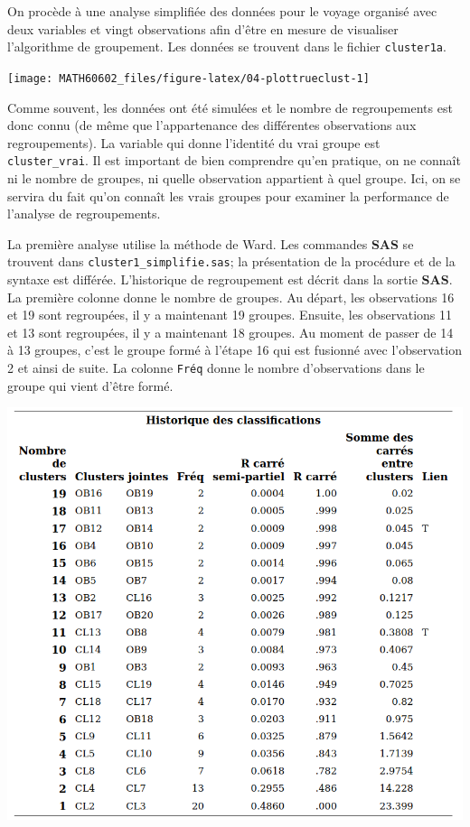 \documentclass[
  11pt,
  letterpaper,
]{book}
\theoremstyle{definition}
\theoremstyle{definition}
\theoremstyle{definition}
\theoremstyle{remark}
\begin{document}
On procède à une analyse simplifiée des données pour le voyage organisé avec deux variables et vingt observations afin d'être en mesure de visualiser l'algorithme de groupement. Les données se trouvent dans le fichier \texttt{cluster1a}.

\begin{center}\texttt{[image: MATH60602\_files/figure-latex/04-plottrueclust-1]} \end{center}

Comme souvent, les données ont été simulées et le nombre de regroupements est donc connu (de même que l'appartenance des différentes observations aux regroupements). La variable qui donne l'identité du vrai groupe est \texttt{cluster\_vrai}. Il est important de bien comprendre qu'en pratique, on ne connaît ni le nombre de groupes, ni quelle observation appartient à quel groupe. Ici, on se servira du fait qu'on connaît les vrais groupes pour examiner la performance de l'analyse de regroupements.

La première analyse utilise la méthode de Ward. Les commandes \textbf{SAS} se trouvent dans \texttt{cluster1\_simplifie.sas}; la présentation de la procédure et de la syntaxe est différée. L'historique de regroupement est décrit dans la sortie \textbf{SAS}. La première colonne donne le nombre de groupes. Au départ, les observations 16 et 19 sont regroupées, il y a maintenant 19 groupes. Ensuite, les observations 11 et 13 sont regroupées, il y a maintenant 18 groupes. Au moment de passer de 14 à 13 groupes, c'est le groupe formé à l'étape 16 qui est fusionné avec l'observation 2 et ainsi de suite. La colonne \texttt{Fréq} donne le nombre d'observations dans le groupe qui vient d'être formé.

\begin{center}\includegraphics[width=0.8\linewidth]{figures/04-clustering-e3} \end{center}
\end{document}
